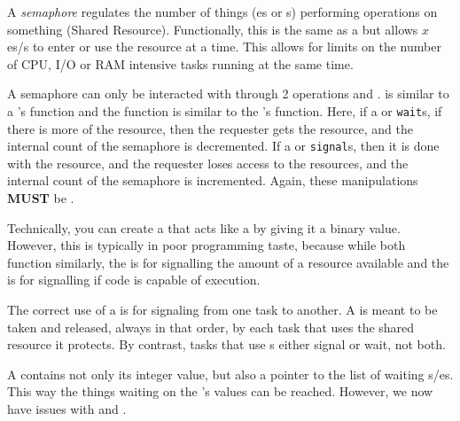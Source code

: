 \begin{definition}[Semaphore]\label{def:Semaphore}
  A \emph{semaphore} regulates the number of things (es or s) performing operations on something (Shared Resource).
  Functionally, this is the same as a  but allows $x$ es/s to enter or use the resource at a time.
  This allows for limits on the number of CPU, I/O or RAM intensive tasks running at the same time.

  A semaphore can only be interacted with through 2 operations  and .
   is similar to a 's  function and the  function is similar to the 's  function.
  Here, if a  or  \texttt{wait}s, if there is more of the resource, then the requester gets the resource, and the internal count of the semaphore is decremented.
  If a  or  \texttt{signal}s, then it is done with the resource, and the requester loses access to the resources, and the internal count of the semaphore is incremented.
  Again, these manipulations \textbf{MUST} be .

  \begin{remark}\label{rmk:Semaphore_Mutex_Confusion}
    Technically, you can create a  that acts like a  by giving it a binary value.
    However, this is typically in poor programming taste, because while both function similarly, the  is for signalling the amount of a resource available and the  is for signalling if code is capable of execution.
  \end{remark}

  \begin{remark}\label{rmk:Semaphore_Correct_Usage}
    The correct use of a  is for signaling from one task to another.
    A  is meant to be taken and released, always in that order, by each task that uses the shared resource it protects.
    By contrast, tasks that use s either signal or wait, not both.
  \end{remark}
\end{definition}

A  contains not only its integer value, but also a pointer to the list of waiting s/es.
This way the things waiting on the 's values can be reached.
However, we now have issues with  and .

